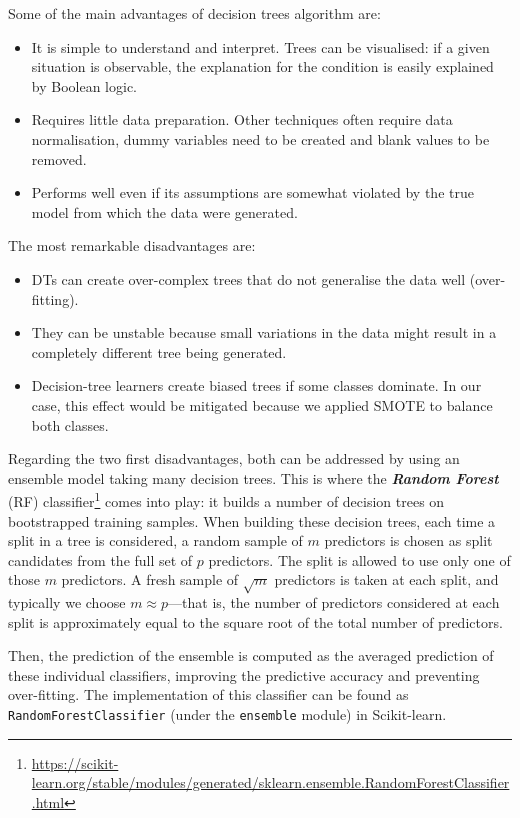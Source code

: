 \documentclass[a4paper, 12pt]{book}
\begin{document}
Some of the main advantages of decision trees algorithm are:
\begin{itemize}
    \item It is simple to understand and interpret. Trees can be visualised: if a given situation is observable, the explanation for the condition is easily explained by Boolean logic.
    \item Requires little data preparation. Other techniques often require data normalisation, dummy variables need to be created and blank values to be removed.
    \item Performs well even if its assumptions are somewhat violated by the true model from which the data were generated.
\end{itemize} 

The most remarkable disadvantages are:
\begin{itemize}
    \item DTs can create over-complex trees that do not generalise the data well (over-fitting).
    \item They can be unstable because small variations in the data might result in a completely different tree being generated.
    \item Decision-tree learners create biased trees if some classes dominate. In our case, this effect would be mitigated because we applied SMOTE to balance both classes.
\end{itemize}

Regarding the two first disadvantages, both can be addressed by using an ensemble model taking
many decision trees. This is where the \textbf{\textit{Random Forest}} (RF) classifier\footnote{\url{https://scikit-learn.org/stable/modules/generated/sklearn.ensemble.RandomForestClassifier.html}}
comes into play: it builds a number of decision trees on bootstrapped training samples. When building
these decision trees, each time a split in a tree is considered, a random sample of $m$ predictors is 
chosen as split candidates from the full set of $p$ predictors. The split is allowed to use only one of 
those $m$ predictors. A fresh sample of $\sqrt{m}$ predictors is taken at each split, and typically
we choose $m \approx p$—that is, the number of predictors considered at each split is approximately
equal to the square root of the total number of predictors.

Then, the prediction of the ensemble is computed as the averaged prediction of these individual 
classifiers, improving the predictive accuracy and preventing over-fitting. The implementation of this 
classifier can be found as \texttt{RandomForestClassifier} (under the \texttt{ensemble} module) 
in Scikit-learn.
\end{document}

